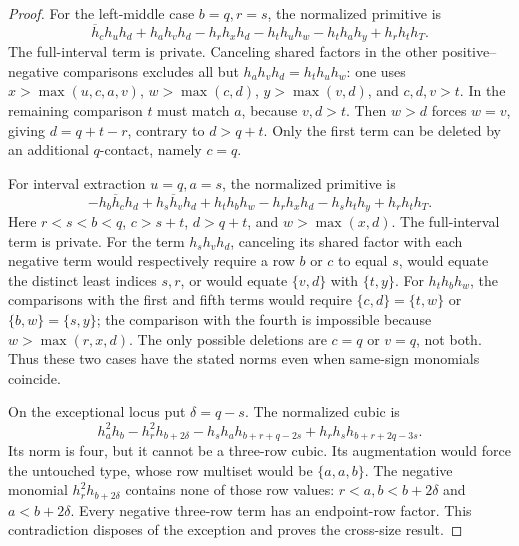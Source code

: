 \documentclass[11pt,a4paper]{amsart}
\numberwithin{equation}{section}
\theoremstyle{plain}
\theoremstyle{definition}
\begin{document}
\begin{proof}
For the left-middle case \(b=q,r=s\), the normalized primitive is
\[
 \overline h_ch_uh_d+h_ah_vh_d-h_rh_xh_d
 -h_th_uh_w-h_th_ah_y+h_rh_th_T.
\]
The full-interval term is private.  Canceling shared factors in the
other positive--negative comparisons excludes all but
\(h_ah_vh_d=h_th_uh_w\): one uses
\(x>\max(u,c,a,v)\), \(w>\max(c,d)\),
\(y>\max(v,d)\), and \(c,d,v>t\).
In the remaining comparison \(t\) must match \(a\), because
\(v,d>t\).  Then \(w>d\) forces \(w=v\), giving
\(d=q+t-r\), contrary to \(d>q+t\).
Only the first term can be deleted by an additional \(q\)-contact,
namely \(c=q\).

For interval extraction \(u=q,a=s\), the normalized primitive is
\[
 -h_b\overline h_ch_d+h_s\overline h_vh_d+h_th_bh_w
 -h_rh_xh_d-h_sh_th_y+h_rh_th_T.
\]
Here \(r<s<b<q\), \(c>s+t\), \(d>q+t\), and
\(w>\max(x,d)\).  The full-interval term is private.
For the term \(h_sh_vh_d\), canceling its shared factor with each
negative term would respectively require a row \(b\) or \(c\)
to equal \(s\), would equate the distinct least indices \(s,r\),
or would equate \(\{v,d\}\) with \(\{t,y\}\).
For \(h_th_bh_w\), the comparisons with the first and fifth terms
would require \(\{c,d\}=\{t,w\}\) or
\(\{b,w\}=\{s,y\}\); the comparison with the fourth is
impossible because \(w>\max(r,x,d)\).
The only possible deletions are \(c=q\) or \(v=q\), not both.
Thus these two cases have the stated norms even when same-sign
monomials coincide.

On the exceptional locus put \(\delta=q-s\).  The normalized cubic is
\[
 h_a^2h_b-h_r^2h_{b+2\delta}
 -h_sh_ah_{b+r+q-2s}+h_rh_sh_{b+r+2q-3s}.
\]
Its norm is four, but it cannot be a three-row cubic.  Its augmentation
would force the untouched type, whose row multiset would be
\(\{a,a,b\}\).  The negative monomial
\(h_r^2h_{b+2\delta}\) contains none of those row values:
\(r<a,b<b+2\delta\) and \(a<b+2\delta\).
Every negative three-row term has an endpoint-row factor.  This
contradiction disposes of the exception and proves the cross-size result.
\end{proof}
\end{document}
